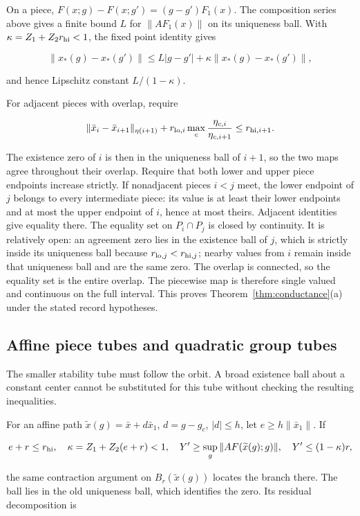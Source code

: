 \documentclass[11pt]{article}
\theoremstyle{definition}
\begin{document}
On a piece, $F(x;g)-F(x;g')=(g-g')F_1(x)$. The composition series above gives a finite bound $L$ for $\|AF_1(x)\|$ on its uniqueness ball. With $\kappa=Z_1+Z_2r_{\rm hi}<1$, the fixed point identity gives

\[
 \|x_*(g)-x_*(g')\|
 \le L|g-g'|+\kappa\|x_*(g)-x_*(g')\|,
\]

and hence Lipschitz constant $L/(1-\kappa)$.

For adjacent pieces with overlap, require

\[
 \|\bar x_i-\bar x_{i+1}\|_{\eta(i+1)}
 +r_{{\rm lo},i}\max_c\frac{\eta_{c,i}}{\eta_{c,i+1}}
 \le r_{{\rm hi},i+1}.
\]

The existence zero of $i$ is then in the uniqueness ball of $i+1$, so the two maps agree throughout their overlap. Require that both lower and upper piece endpoints increase strictly. If nonadjacent pieces $i<j$ meet, the lower endpoint of $j$ belongs to every intermediate piece: its value is at least their lower endpoints and at most the upper endpoint of $i$, hence at most theirs. Adjacent identities give equality there. The equality set on $P_i\cap P_j$ is closed by continuity. It is relatively open: an agreement zero lies in the existence ball of $j$, which is strictly inside its uniqueness ball because $r_{{\rm lo},j}<r_{{\rm hi},j}$; nearby values from $i$ remain inside that uniqueness ball and are the same zero. The overlap is connected, so the equality set is the entire overlap. The piecewise map is therefore single valued and continuous on the full interval. This proves Theorem~\ref{thm:conductance}(a) under the stated record hypotheses.

\subsection{Affine piece tubes and quadratic group tubes}\label{sec:cg-5}

The smaller stability tube must follow the orbit. A broad existence ball about a constant center cannot be substituted for this tube without checking the resulting inequalities.

For an affine path $\widetilde x(g)=\bar x+d\bar x_1$, $d=g-g_c$, $|d|\le h$, let $e\ge h\|\bar x_1\|$. If

\[
 e+r\le r_{\rm hi},\quad
 \kappa=Z_1+Z_2(e+r)<1,\quad
 Y'\ge\sup_g\|AF(\widetilde x(g);g)\|,\quad
 Y'\le(1-\kappa)r,
\]

the same contraction argument on $B_r(\widetilde x(g))$ locates the branch there. The ball lies in the old uniqueness ball, which identifies the zero. Its residual decomposition is
\end{document}
